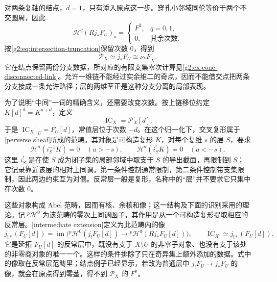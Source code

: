\begin{example}\label{g2:exm:node-intersection-sheaf}
	对两条复轴的结点，\(d=1\)，只有添入原点这一步。穿孔小邻域同伦等价于两个不交圆周，因此
	\[
		\mathcal H^q(Rj_*F_U)_o=
		\begin{cases}F^2,&q=0,1,\\0,&\text{其余次数}.
		\end{cases}
	\]
	按\cref{g2:eq:intersection-truncation}保留次数 \(0\)，得到
	\[
		\mathcal P_X\simeq j_*F_U\cong\nu_*F_{\widetilde X}.
	\]
	它在结点保留两份分支数据，所对应的有限支集零次计算见\cref{g2:ex:cone-disconnected-link}。允许一维链不能经过实余维二的奇点，因而不能借交点把两条分支接成一条允许路径；层的两维茎正是这种分支分离的局部表现。
\end{example}

为了说明“中间”一词的精确含义，还需要改变次数。按上链移位约定 \(K[d]^a=K^{a+d}\)，定义
\[
	\operatorname{IC}_X=\mathcal P_X[d].
\]
于是 \(\operatorname{IC}_X|_U=F_U[d]\)，常值层位于次数 \(-d\)。在这个归一化下，交叉复形属于[perverse sheaf]所成的范畴。其对象是可构造复形 \(K\)，对每个复维 \(s\) 的层 \(S\)，要求
\[
	\mathcal H^a(i_S^{-1}K)=0\quad(a>-s),\qquad
	\mathcal H^a(i_S^!K)=0\quad(a<-s).
\]
这里 \(i_S^!\) 是在使 \(S\) 成为闭子集的局部邻域中取支于 \(S\) 的导出截面，再限制到 \(S\)；它记录靠近该层的相对上同调。第一条件控制通常限制，第二条件控制带支集限制，因此两边约束互为对偶。反常层一般是复形，名称中的“层”并不要求它只集中在次数 \(0\)。

\ProseParagraphBreak

这些对象构成 Abel 范畴，因而有核、余核和像；这一结构及下面的识别采用\cite[第5.1节、定义5.2.6及第5.4节]{Dimca2004Sheaves}的理论。记 \({}^p\mathcal H^0\) 为该范畴的零次上同调函子，其作用是从一个可构造复形提取相应的反常层。[intermediate extension]定义为此范畴内的像
\begin{equation}\label{g2:eq:intermediate-extension}
	j_{!*}(F_U[d])
	=\operatorname{im}\bigl({}^p\mathcal H^0(j_!F_U[d])
	\longrightarrow{}^p\mathcal H^0(Rj_*F_U[d])\bigr),
	\qquad \operatorname{IC}_X\simeq j_{!*}(F_U[d]).
\end{equation}
它是延拓 \(F_U[d]\) 的反常层中，既没有支于 \(X\setminus U\) 的非零子对象、也没有支于该处的非零商对象的唯一一个。这样的条件排除了只在奇异集上额外添加的数据。式中的像取在反常层范畴里；结点例子已经显示，若改为普通层中 \(j_!F_U\to j_*F_U\) 的像，就会在原点得到零茎，得不到 \(\mathcal P_X\) 的 \(F^2\)。

